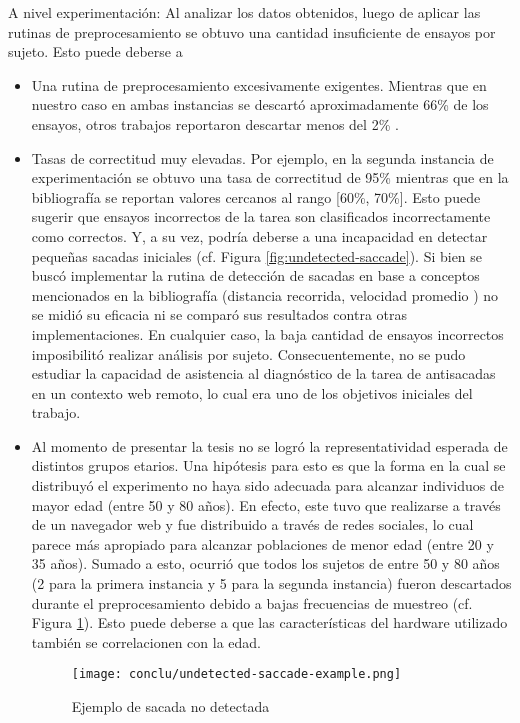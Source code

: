 A nivel experimentación: Al analizar los datos obtenidos, luego de aplicar las
rutinas de preprocesamiento se obtuvo una cantidad insuficiente de ensayos por
sujeto.
Esto puede deberse a 
\begin{itemize}
  \item Una rutina de preprocesamiento excesivamente exigentes.
  Mientras que en nuestro caso en ambas instancias se descartó aproximadamente
66\% de los ensayos, otros trabajos reportaron descartar menos del 2\%
\cite{unsworth_2011_distribution_analysis}. 

  \item Tasas de correctitud muy elevadas.
  Por ejemplo, en la segunda instancia de experimentación se obtuvo una tasa de
correctitud de 95\% mientras que en la bibliografía se reportan valores
cercanos al rango [60\%, 70\%].
  Esto puede sugerir que ensayos incorrectos de la tarea son clasificados
incorrectamente como correctos.
  Y, a su vez, podría deberse a una incapacidad en detectar pequeñas sacadas
iniciales (cf. Figura \ref{fig:undetected-saccade}).
  Si bien se buscó implementar la rutina de detección de sacadas en base a
conceptos mencionados en la bibliografía (distancia recorrida, velocidad
promedio \cite{stuart_2019_saccade_detection_algorithms}) no se midió su
eficacia ni se comparó sus resultados contra otras implementaciones.
  En cualquier caso, la baja cantidad de ensayos incorrectos imposibilitó
realizar análisis por sujeto.
  Consecuentemente, no se pudo estudiar la capacidad de asistencia al
diagnóstico de la tarea de antisacadas en un contexto web remoto, lo cual era
uno de los objetivos iniciales del trabajo.

  \item Al momento de presentar la tesis no se logró la representatividad
esperada de distintos grupos etarios.
  Una hipótesis para esto es que la forma en la cual se distribuyó el
experimento no haya sido adecuada para alcanzar individuos de mayor edad (entre
50 y 80 años).
  En efecto, este tuvo que realizarse a través de un navegador web y fue
distribuido a través de redes sociales, lo cual parece más apropiado para
alcanzar poblaciones de menor edad (entre 20 y 35 años).
  Sumado a esto, ocurrió que todos los sujetos de entre 50 y 80 años (2 para la
primera instancia y 5 para la segunda instancia) fueron descartados durante el
preprocesamiento debido a bajas frecuencias de muestreo (cf. Figura
\ref{fig:sampling-frequency-by-age}).
  Esto puede deberse a que las características del hardware utilizado también
se correlacionen con la edad.

  \begin{figure}
    \centering
    \texttt{[image: conclu/undetected-saccade-example.png]}
    \caption{Ejemplo de sacada no detectada}
    \label{fig:sampling-frequency-by-age}
  \end{figure}

\end{itemize}

